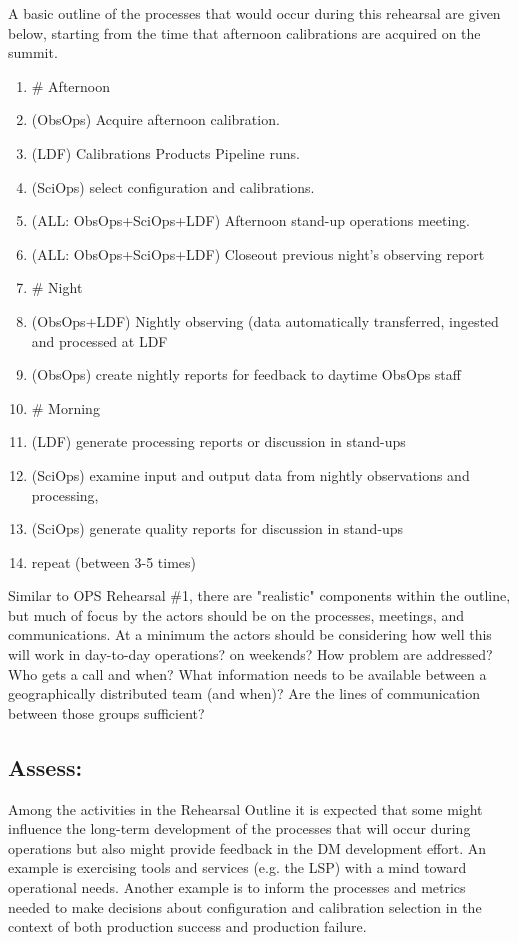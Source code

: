 A basic outline of the processes that would occur during this rehearsal are given below, 
starting from the time that afternoon calibrations are acquired on the summit.
\begin{enumerate}[topsep=-8pt]
\item \# Afternoon
\item (ObsOps) Acquire afternoon calibration.
\item (LDF) Calibrations Products Pipeline runs.
\item (SciOps) select configuration and calibrations.
\item (ALL: ObsOps+SciOps+LDF) Afternoon stand-up operations meeting.  
\item (ALL: ObsOps+SciOps+LDF) Closeout previous night's observing report
\item \# Night
\item (ObsOps+LDF) Nightly observing (data automatically transferred, ingested and processed at LDF
\item (ObsOps) create nightly reports for feedback to daytime ObsOps staff
\item \# Morning
\item (LDF) generate processing reports or discussion in stand-ups
\item (SciOps) examine input and output data from nightly observations and processing, 
\item (SciOps) generate quality reports for discussion in stand-ups
\item repeat (between 3-5 times)
\end{enumerate}

Similar to OPS Rehearsal \#1, there are "realistic" components within the outline, but 
much of focus by the actors should be on the processes, meetings, and communications.
At a minimum the actors should be considering how well this will work in day-to-day 
operations?  on weekends?  How problem are addressed?  Who gets a call and when?  
What information needs to be available between a geographically distributed team (and when)?  
Are the lines of communication between those groups sufficient?

\subsection{Assess:}

Among the activities in the Rehearsal Outline it is expected that some might influence 
the long-term development of the processes that will occur during operations but also 
might provide feedback in the DM development effort.  An example is exercising tools 
and services (e.g. the LSP) with a mind toward operational needs.  Another example is 
to inform the processes and metrics needed to make decisions about configuration and 
calibration selection in the context of both production success and production failure.

